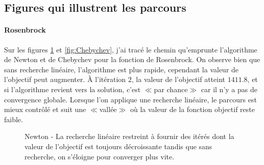 \subsection{Figures qui illustrent les parcours}


\paragraph{Rosenbrock}

Sur les figures \ref{fig:Newton} et \ref{fig:Chebychev}, j'ai trac\'e le chemin qu'emprunte 
l'algorithme de Newton et de Chebychev pour la fonction de Rosenbrock.
On observe bien que sans recherche lin\'eaire, l'algorithme est plus rapide,
cependant la valeur de l'objectif peut augmenter. \`A l'it\'eration $2$, la valeur de l'objectif
 atteint $1411.8$, et si l'algorithme revient vers la solution, c'est {$\scriptscriptstyle\ll$}par chance{$\scriptscriptstyle\gg$} car il n'y a pas de convergence globale.
 Lorsque l'on applique une recherche lin\'eaire, le parcours est mieux contrôl\'e et suit une {$\scriptscriptstyle\ll$}vall\'ee{$\scriptscriptstyle\gg$} o\`u la valeur de la
fonction objectif reste faible.

\begin{figure}
\caption{Newton - La recherche lin\'eaire restreint \`a fournir des it\'er\'es dont la valeur de l'objectif est 
toujours d\'ecroissante tandis que sans recherche, on s'\'eloigne pour converger plus vite.}
\begin{center}
\end{center}
\label{fig:Newton}
\end{figure}

